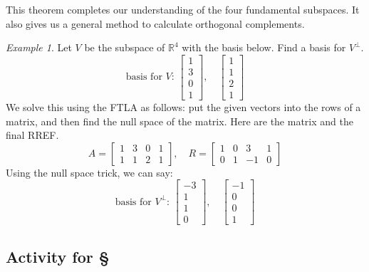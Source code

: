 \documentclass[11pt,oneside]{amsbook}
\newcommand{\R}{\mathbb R}
\theoremstyle{definition}
\theoremstyle{plain}
\theoremstyle{definition}
\theoremstyle{remark}
\newtheorem{example}[theorem]{Example}
\numberwithin{equation}{section}
\numberwithin{figure}{section}
\begin{document}
This theorem completes our understanding of the four fundamental subspaces. It also gives us a general method to calculate orthogonal complements.

\begin{example}
  Let $V$ be the subspace of $\R^4$ with the basis below. Find a basis for $V^\perp$.
  \[\text{basis for $V$: }\begin{bmatrix}1\\3\\0\\1\end{bmatrix},\quad
    \begin{bmatrix}1\\1\\2\\1\end{bmatrix}
  \]
  We solve this using the FTLA as follows: put the given vectors into the rows of a matrix, and then find the null space of the matrix. Here are the matrix and the final RREF.
  \[A=\begin{bmatrix}1&3&0&1\\1&1&2&1\end{bmatrix},\quad
  R=\begin{bmatrix}1&0&3&1\\0&1&-1&0\end{bmatrix}
  \]
  Using the null space trick, we can say:
  \[\text{basis for $V^\perp$: }\begin{bmatrix}-3\\1\\1\\0\end{bmatrix},\quad
  \begin{bmatrix}-1\\0\\0\\1\end{bmatrix}
  \]
\end{example}

\newpage
\subsection*{Activity for \S \thesection}
\end{document}
